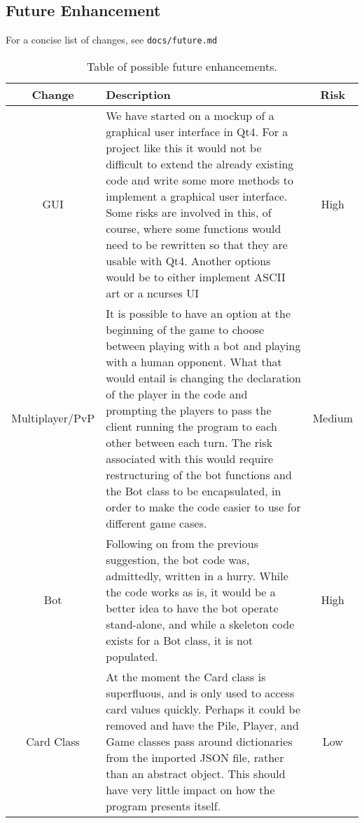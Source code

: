 \documentclass[12pt,a4paper,tightenlines]{article}
\begin{document}
\newpage
\subsection{Future Enhancement}
For a concise list of changes, see \texttt{docs/future.md}
\begin{table}[!ht]
    \begin{tabular}{|c|m{10cm}|c|}
        \hline
        Change & Description & Risk\\
        \hline
        GUI & We have started on a mockup of a graphical user interface
        in Qt4. For a project like this it would not be difficult
        to extend the already existing code and write some more
        methods to implement a graphical user interface. Some risks are 
        involved in this, of course, where some functions would need to be
        rewritten so that they are usable with Qt4. Another options would
        be to either implement ASCII art or a ncurses UI& 
        \cellcolor{red!50}High \\
        \hline
        Multiplayer/PvP & It is possible to have an option at the 
        beginning of the game to choose between playing with a bot
        and playing with a human opponent. What that would entail
        is changing the declaration of the player in the code and
        prompting the players to pass the client running the program
        to each other between each turn. The risk associated with this
        would require restructuring of the bot functions and the 
        Bot class to be encapsulated, in order to make the code easier
        to use for different game cases. & \cellcolor{yellow!50} Medium\\
        \hline
        Bot & Following on from the previous suggestion, the bot code was,
        admittedly, written in a hurry. While the code works as is, 
        it would be a better idea to have the bot operate 
        stand-alone, and while a skeleton code exists for a Bot
        class, it is not populated. & \cellcolor{red!50} High\\
        \hline
        Card Class & At the moment the Card class is superfluous, and
        is only used to access card values quickly. Perhaps it could
        be removed and have the Pile, Player, and Game classes pass around
        dictionaries from the imported JSON file, rather than an abstract 
        object. This should have very little impact on how the program
        presents itself.& \cellcolor{green!50} Low\\
        \hline
    \end{tabular}
    \caption{Table of possible future enhancements.}
\end{table}
\end{document}
